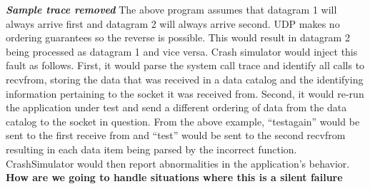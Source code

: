             \textbf{\emph{Sample trace removed}}
            The above program assumes that datagram 1 will always arrive first and datagram 2 will always arrive second. UDP
            makes no ordering guarantees so the reverse is possible. This would result in datagram 2 being processed as
            datagram 1 and vice versa. Crash simulator would inject this fault as follows. First, it would parse the system
            call trace and identify all calls to recvfrom, storing the data that was received in a data catalog and the
            identifying information pertaining to the socket it was received from. Second, it would re-run the application
            under test and send a different ordering of data from the data catalog to the socket in question. From the above
            example, ``testagain'' would be sent to the first receive from and ``test'' would be sent to the second recvfrom
            resulting in each data item being parsed by the incorrect function. CrashSimulator would then report
            abnormalities in the application's behavior. \textbf{How are we going to handle situations where this is a
            silent failure}
